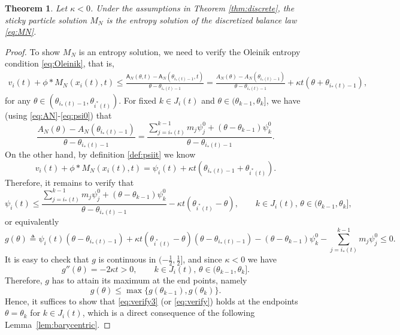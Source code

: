 \documentclass[11pt,reqno]{amsart}
\newtheorem{theorem}{Theorem}[section]
\theoremstyle{definition}
\theoremstyle{remark}
\def\A{\mathsf{A}}
\begin{document}
	
	\begin{theorem}\label{thm:discreteattractive}
		Let $\kappa<0$. Under the assumptions in Theorem \ref{thm:discrete}, the sticky particle solution $M_N$ is the entropy solution of the discretized balance law \eqref{eq:MN}.	
	\end{theorem}
	\begin{proof}
		To show $M_N$ is an entropy solution, we need to verify the Oleinik entropy condition \eqref{eq:Oleinik}, that is,
		\begin{align*}
			v_i(t) + \phi\ast M_N(x_i(t),t)  \le \frac{\A_N(\theta,t) - \A_N(\theta_{i_*(t)-1},t)}{\theta - \theta_{i_*(t)-1}} = \frac{A_N(\theta) - A_N(\theta_{i_*(t)-1})}{\theta - \theta_{i_*(t)-1}} + \kappa t (\theta+\theta_{i_*(t)-1}),
		\end{align*}
		for any $\theta\in (\theta_{i_*(t)-1}, \theta_{i^*(t)})$.
		For fixed $k\in J_i(t)$ and $\theta\in (\theta_{k-1}, \theta_k]$, we have (using \eqref{eq:AN}-\eqref{eq:psi0}) that
		\[
		\frac{A_N(\theta) - A_N(\theta_{i_*(t)-1})}{\theta - \theta_{i_*(t)-1}} = \frac{\sum_{j=i_*(t)}^{k-1} m_j\psi_j^0 + (\theta-\theta_{k-1})\psi_k^0}{\theta - \theta_{i_*(t)-1}}.%
		\]
		On the other hand, by definition \eqref{def:psiit} we know
		\[
		v_i(t) + \phi\ast M_N(x_i(t),t) = \psi_i(t) + \kappa t(\theta_{i_*(t)-1}+\theta_{i^*(t)}).
		\]
		Therefore, it remains to verify that
		\begin{equation}\label{eq:verify}
			\psi_i(t) \leq \frac{\sum_{j=i_*(t)}^{k-1} m_j\psi_j^0 + (\theta-\theta_{k-1})\psi_k^0}{\theta - \theta_{i_*(t)-1}} - \kappa t (\theta_{i^*(t)}-\theta),
			\qquad k\in J_i(t),\, \theta\in(\theta_{k-1}, \theta_k],
		\end{equation}
		or equivalently
		\begin{equation}\label{eq:verify3}
			g(\theta)\triangleq\psi_i(t)(\theta - \theta_{i_*(t)-1}) + \kappa t (\theta_{i^*(t)}-\theta)(\theta - \theta_{i_*(t)-1}) - (\theta-\theta_{k-1})\psi_k^0  - \sum_{j=i_*(t)}^{k-1} m_j\psi_j^0 \leq 0.
		\end{equation}
		It is easy to check that $g$ is continuous in $(-\frac12,\frac12]$, and since $\kappa<0$ we have
		\[
		g''(\theta) = -2\kappa t >0,\qquad k\in J_i(t),\, \theta\in(\theta_{k-1}, \theta_k].
		\]
		Therefore, $g$ has to attain its maximum at the end points, namely
		\[
		g(\theta)\leq \max\{g(\theta_{k-1}),g(\theta_k)\}.
		\]
		Hence, it suffices to show that \eqref{eq:verify3} (or \eqref{eq:verify}) holds at the endpoints $\theta=\theta_k$ for $k\in J_i(t)$, which is a direct consequence of the following Lemma~\ref{lem:barycentric}.
	\end{proof}
	
\end{document}
